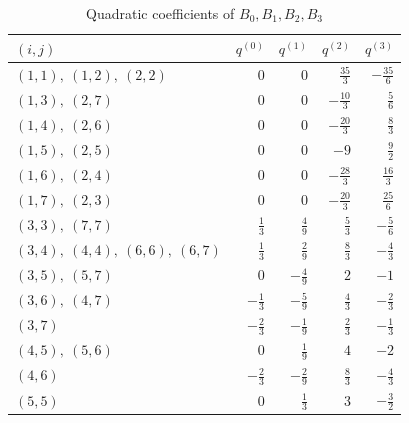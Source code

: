 \documentclass[11pt,reqno]{amsart}
\theoremstyle{definition}\newtheorem{definition}[theorem]{Definition}
\theoremstyle{remark}\newtheorem{remark}[theorem]{Remark}
\numberwithin{equation}{section}
\begin{document}
\begin{table}[!htbp]
\centering\small\renewcommand{\arraystretch}{1.15}
\caption{Quadratic coefficients of $B_0,B_1,B_2,B_3$}\label{tab:Bquadratic}
\begin{tabular}{@{}lrrrr@{}}\toprule
$(i,j)$ & $q^{(0)}$ & $q^{(1)}$ & $q^{(2)}$ & $q^{(3)}$\\\midrule
$(1,1),\ (1,2),\ (2,2)$ & $0$ & $0$ & $\frac{35}{3}$ & $- \frac{35}{6}$\\
$(1,3),\ (2,7)$ & $0$ & $0$ & $- \frac{10}{3}$ & $\frac{5}{6}$\\
$(1,4),\ (2,6)$ & $0$ & $0$ & $- \frac{20}{3}$ & $\frac{8}{3}$\\
$(1,5),\ (2,5)$ & $0$ & $0$ & $-9$ & $\frac{9}{2}$\\
$(1,6),\ (2,4)$ & $0$ & $0$ & $- \frac{28}{3}$ & $\frac{16}{3}$\\
$(1,7),\ (2,3)$ & $0$ & $0$ & $- \frac{20}{3}$ & $\frac{25}{6}$\\
$(3,3),\ (7,7)$ & $\frac{1}{3}$ & $\frac{4}{9}$ & $\frac{5}{3}$ & $- \frac{5}{6}$\\
$(3,4),\ (4,4),\ (6,6),\ (6,7)$ & $\frac{1}{3}$ & $\frac{2}{9}$ & $\frac{8}{3}$ & $- \frac{4}{3}$\\
$(3,5),\ (5,7)$ & $0$ & $- \frac{4}{9}$ & $2$ & $-1$\\
$(3,6),\ (4,7)$ & $- \frac{1}{3}$ & $- \frac{5}{9}$ & $\frac{4}{3}$ & $- \frac{2}{3}$\\
$(3,7)$ & $- \frac{2}{3}$ & $- \frac{1}{9}$ & $\frac{2}{3}$ & $- \frac{1}{3}$\\
$(4,5),\ (5,6)$ & $0$ & $\frac{1}{9}$ & $4$ & $-2$\\
$(4,6)$ & $- \frac{2}{3}$ & $- \frac{2}{9}$ & $\frac{8}{3}$ & $- \frac{4}{3}$\\
$(5,5)$ & $0$ & $\frac{1}{3}$ & $3$ & $- \frac{3}{2}$\\
\bottomrule\end{tabular}
\end{table}
\end{document}
